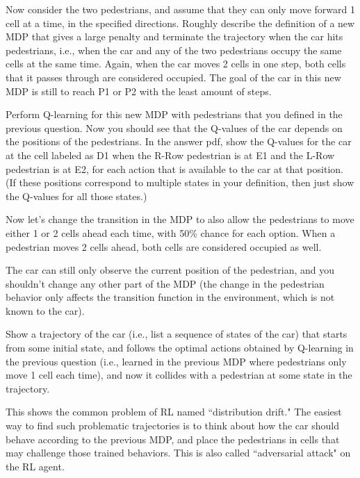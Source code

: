\documentclass{article}
\begin{document}
\begin{question}[2 Points]
Now consider the two pedestrians, and assume that they can only move forward 1 cell at a time, in the specified directions. Roughly describe the definition of a new MDP that gives a large penalty and terminate the trajectory when the car hits pedestrians, i.e., when the car and any of the two pedestrians occupy the same cells at the same time. Again, when the car moves 2 cells in one step, both cells that it passes through are considered occupied. The goal of the car in this new MDP is still to reach P1 or P2 with the least amount of steps. 
\end{question}

\begin{question}[2 Points]
 Perform Q-learning for this new MDP with pedestrians that you defined in the previous question. Now you should see that the Q-values of the car depends on the positions of the pedestrians. In the answer pdf, show the Q-values for the car at the cell labeled as D1 when the R-Row pedestrian is at E1 and the L-Row pedestrian is at E2, for each action that is available to the car at that position. (If these positions correspond to multiple states in your definition, then just show the Q-values for all those states.) 
\end{question}

\begin{question}
Now let's change the transition in the MDP to also allow the pedestrians to move either 1 or 2 cells ahead each time, with 50\% chance for each option. When a pedestrian moves 2 cells ahead, both cells are considered occupied as well. 

The car can still only observe the current position of the pedestrian, and you shouldn't change any other part of the MDP (the change in the pedestrian behavior only affects the transition function in the environment, which is not known to the car). 

Show a trajectory of the car (i.e., list a sequence of states of the car) that starts from some initial state, and follows the optimal actions obtained by Q-learning in the previous question (i.e., learned in the previous MDP where pedestrians only move 1 cell each time), and now it collides with a pedestrian at some state in the trajectory. 

This shows the common problem of RL named ``distribution drift." The easiest way to find such problematic trajectories is to think about how the car should behave according to the previous MDP, and place the pedestrians in cells that may challenge those trained behaviors. This is also called ``adversarial attack" on the RL agent. 
\end{question}
\end{document}
